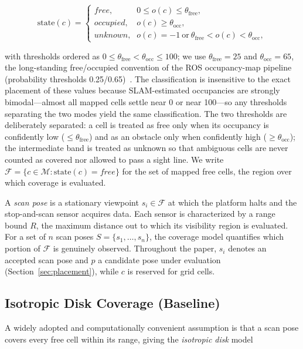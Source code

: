 \documentclass[sensors,article,submit,pdftex,moreauthors]{Definitions/mdpi}
\begin{document}
\begin{equation}
\mathrm{state}(c)=
\begin{cases}
\textit{free}, & 0 \le o(c) \le \theta_{\mathrm{free}}, \\
\textit{occupied}, & o(c) \ge \theta_{\mathrm{occ}}, \\
\textit{unknown}, & o(c)=-1 \ \text{or}\ \theta_{\mathrm{free}}<o(c)<\theta_{\mathrm{occ}},
\end{cases}
\end{equation}

with thresholds ordered as $0\le\theta_{\mathrm{free}}<
\theta_{\mathrm{occ}}\le100$; we use $\theta_{\mathrm{free}}=25$ and
$\theta_{\mathrm{occ}}=65$, the long-standing free/occupied convention of the
ROS occupancy-map pipeline (probability thresholds 0.25/0.65)~\cite{macenski2020}.
The classification is insensitive to the exact placement of these values
because SLAM-estimated occupancies are strongly bimodal---almost all mapped
cells settle near 0 or near 100---so any thresholds separating the two modes
yield the same classification. The two thresholds are deliberately separated: a
cell is treated as free only when its occupancy is confidently low
($\le\theta_{\mathrm{free}}$) and as an obstacle only when confidently high
($\ge\theta_{\mathrm{occ}}$); the intermediate band is treated as unknown so
that ambiguous cells are never counted as covered nor allowed to pass a sight
line. We write
$\mathcal{F}=\{c\in\mathcal{M}:\mathrm{state}(c)=\textit{free}\}$ for
the set of mapped free cells, the region over which coverage is evaluated.

A \emph{scan pose} is a stationary viewpoint $s_i\in\mathcal{F}$ at which the
platform halts and the stop-and-scan sensor acquires data. Each sensor is
characterized by a range bound $R$, the maximum distance out to which its
visibility region is evaluated. For a set of $n$ scan poses
$S=\{s_1,\dots,s_n\}$, the coverage model quantifies which portion of
$\mathcal{F}$ is genuinely observed. Throughout the paper, $s_i$ denotes an
accepted scan pose and $p$ a candidate pose under evaluation
(Section~\ref{sec:placement}), while $c$ is reserved for grid cells.

\subsection{Isotropic Disk Coverage (Baseline)}
\label{sec:disk}

A widely adopted and computationally convenient assumption is that a scan pose
covers every free cell within its range, giving the \emph{isotropic disk} model
\end{document}
